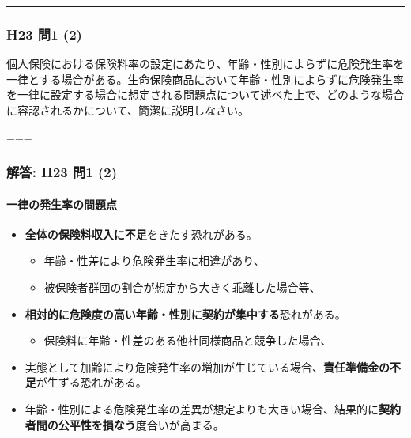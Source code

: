 \documentclass[]{article}
\begin{document}
\begin{center}\rule{0.5\linewidth}{0.5pt}\end{center}

\hypertarget{h23-ux554f1-2}{%
\subsubsection{H23 問1 (2)}\label{h23-ux554f1-2}}

個人保険における保険料率の設定にあたり、年齢・性別によらずに危険発生率を一律とする場合がある。生命保険商品において年齢・性別によらずに危険発生率を一律に設定する場合に想定される問題点について述べた上で、どのような場合に容認されるかについて、簡潔に説明しなさい。

===

\hypertarget{ux89e3ux7b54-h23-ux554f1-2}{%
\subsubsection{解答: H23 問1 (2)}\label{ux89e3ux7b54-h23-ux554f1-2}}

\hypertarget{ux4e00ux5f8bux306eux767aux751fux7387ux306eux554fux984cux70b9}{%
\paragraph{一律の発生率の問題点}\label{ux4e00ux5f8bux306eux767aux751fux7387ux306eux554fux984cux70b9}}

\begin{itemize}
\tightlist
\item
  \textbf{全体の保険料収入に不足}をきたす恐れがある。

  \begin{itemize}
  \tightlist
  \item
    年齢・性差により危険発生率に相違があり、
  \item
    被保険者群団の割合が想定から大きく乖離した場合等、
  \end{itemize}
\item
  \textbf{相対的に危険度の高い年齢・性別に契約が集中する}恐れがある。

  \begin{itemize}
  \tightlist
  \item
    保険料に年齢・性差のある他社同様商品と競争した場合、
  \end{itemize}
\item
  実態として加齢により危険発生率の増加が生じている場合、\textbf{責任準備金の不足}が生ずる恐れがある。
\item
  年齢・性別による危険発生率の差異が想定よりも大きい場合、結果的に\textbf{契約者間の公平性を損なう}度合いが高まる。
\end{itemize}
\end{document}
